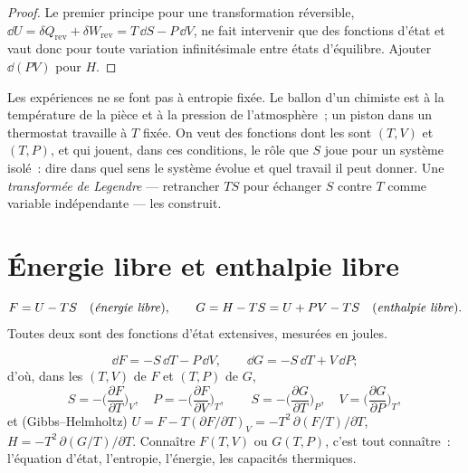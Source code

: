 \begin{proof}
Le premier principe pour une transformation réversible, $\dd U = \delta Q_{\text{rev}}
+ \delta W_{\text{rev}} = T\,\dd S - P\,\dd V$, ne fait intervenir que des fonctions
d'état et vaut donc pour toute variation infinitésimale entre
états d'équilibre. Ajouter $\dd(PV)$ pour $H$.
\end{proof}

\begin{remark}\label{rem:b2:thermodynamic-potentials:why}
Les expériences ne se font pas à entropie fixée. Le ballon d'un chimiste est à
la température de la pièce et à la pression de l'atmosphère~; un
piston dans un thermostat travaille à $T$ fixée. On veut des fonctions dont les
 sont $(T,V)$ et $(T,P)$, et qui jouent, dans ces
conditions, le rôle que $S$ joue pour un système isolé~: dire
dans quel sens le système évolue et quel travail il peut donner. Une
\emph{transformée de Legendre} --- retrancher $TS$ pour échanger $S$ contre $T$ comme
variable indépendante --- les construit.
\end{remark}

\section{Énergie libre et enthalpie libre}

\begin{definition}\label{def:b2:thermodynamic-potentials:FG}
\[
F = U - TS \quad\text{(\emph{énergie libre}\index{énergie libre})}, \qquad
G = H - TS = U + PV - TS \quad\text{(\emph{enthalpie libre}\index{enthalpie libre})}.
\]
Toutes deux sont des fonctions d'état extensives, mesurées en joules.
\end{definition}

\begin{theorem}\label{thm:b2:thermodynamic-potentials:dFdG}
\[
\dd F = -S\,\dd T - P\,\dd V, \qquad
\dd G = -S\,\dd T + V\,\dd P ;
\]
d'où, dans les  $(T,V)$ de $F$ et $(T,P)$ de $G$,
\[
S = -\Big(\frac{\partial F}{\partial T}\Big)_V, \quad
P = -\Big(\frac{\partial F}{\partial V}\Big)_T, \qquad
S = -\Big(\frac{\partial G}{\partial T}\Big)_P, \quad
V = \Big(\frac{\partial G}{\partial P}\Big)_T ,
\]
et (Gibbs--Helmholtz) $U = F - T(\partial F/\partial T)_V =
-T^2\,\partial(F/T)/\partial T$, $H = -T^2\,\partial(G/T)/\partial T$.
Connaître $F(T,V)$ ou $G(T,P)$, c'est tout connaître~: l'équation
d'état, l'entropie, l'énergie, les capacités thermiques.
\end{theorem}

